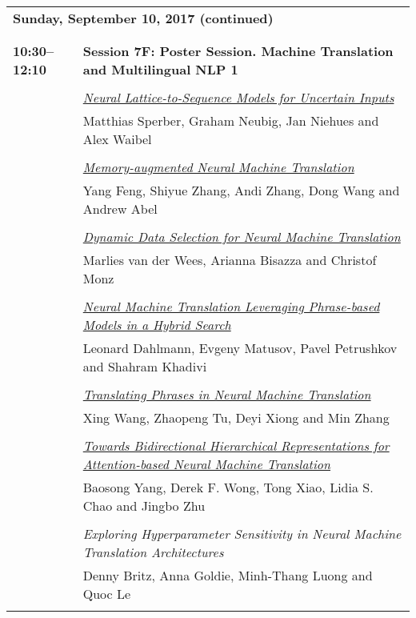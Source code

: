 \newpage
\begin{tabular}{p{20mm}p{128mm}}
\\
\multicolumn{2}{l}{\bf Sunday, September 10, 2017 (continued)} \\\\
\\{\bf 10:30--12:10} & {\bf Session 7F: Poster Session. Machine Translation and Multilingual NLP 1 } \\
\\
 & \hyperlink{page.1389}{\em Neural Lattice-to-Sequence Models for Uncertain Inputs}\\
         & Matthias Sperber, Graham Neubig, Jan Niehues and Alex Waibel \\
\\

 & \hyperlink{page.1399}{\em Memory-augmented Neural Machine Translation}\\
         & Yang Feng, Shiyue Zhang, Andi Zhang, Dong Wang and Andrew Abel \\
\\

 & \hyperlink{page.1409}{\em Dynamic Data Selection for Neural Machine Translation}\\
         & Marlies van der Wees, Arianna Bisazza and Christof Monz \\
\\

 & \hyperlink{page.1420}{\em Neural Machine Translation Leveraging Phrase-based Models in a Hybrid Search}\\
         & Leonard Dahlmann, Evgeny Matusov, Pavel Petrushkov and Shahram Khadivi \\
\\

 & \hyperlink{page.1430}{\em Translating Phrases in Neural Machine Translation}\\
         & Xing Wang, Zhaopeng Tu, Deyi Xiong and Min Zhang \\
\\

 & \hyperlink{page.1441}{\em Towards Bidirectional Hierarchical Representations for Attention-based Neural Machine Translation}\\
         & Baosong Yang, Derek F. Wong, Tong Xiao, Lidia S. Chao and Jingbo Zhu \\
\\

 & {\em Exploring Hyperparameter Sensitivity in Neural Machine Translation Architectures}\\
         & Denny Britz, Anna Goldie, Minh-Thang Luong and Quoc Le \\
\\


\end{tabular}
